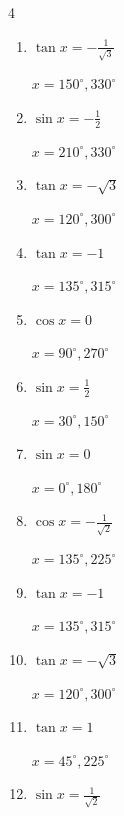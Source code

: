 \begin{multicols}{4}
\begin{enumerate}
  \item $\displaystyle \tan{x}  = -\frac{1}{\sqrt{3}}$

        $\displaystyle x = 150^{\circ} , 330^{\circ}$

\columnbreak %

\resetques

  \item $\displaystyle \sin{x}  = -\frac{1}{2}$

        $\displaystyle x = 210^{\circ} , 330^{\circ}$

  \item $\displaystyle \tan{x}  = -\sqrt{3}$

        $\displaystyle x = 120^{\circ} , 300^{\circ}$

  \item $\displaystyle \tan{x}  = -1$

        $\displaystyle x = 135^{\circ} , 315^{\circ}$

  \item $\displaystyle \cos{x}  = 0$

        $\displaystyle x = 90^{\circ} , 270^{\circ}$

  \item $\displaystyle \sin{x}  = \frac{1}{2}$

        $\displaystyle x = 30^{\circ} , 150^{\circ}$

  \item $\displaystyle \sin{x}  = 0$

        $\displaystyle x = 0^{\circ} , 180^{\circ}$

  \item $\displaystyle \cos{x}  = -\frac{1}{\sqrt{2}}$

        $\displaystyle x = 135^{\circ} , 225^{\circ}$

  \item $\displaystyle \tan{x}  = -1$

        $\displaystyle x = 135^{\circ} , 315^{\circ}$

  \item $\displaystyle \tan{x}  = -\sqrt{3}$

        $\displaystyle x = 120^{\circ} , 300^{\circ}$

  \item $\displaystyle \tan{x}  = 1$

        $\displaystyle x = 45^{\circ} , 225^{\circ}$

  \item $\displaystyle \sin{x}  = \frac{1}{\sqrt{2}}$


\end{enumerate}
\end{multicols}
